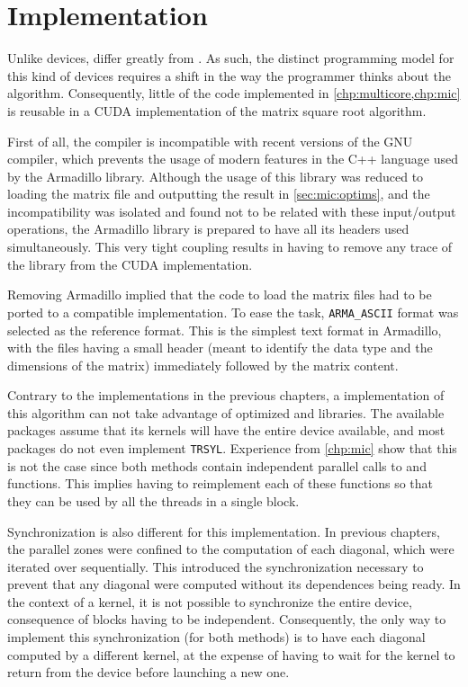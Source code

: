\documentclass[../thesis]{subfiles}
\begin{document}
	\section{Implementation}
	\label{sec:cuda:implementation}
	
	Unlike \mic devices, \gpus differ greatly from \cpus. As such, the distinct programming model for this kind of devices requires a shift in the way the programmer thinks about the algorithm. Consequently, little of the code implemented in \cref{chp:multicore,chp:mic} is reusable in a CUDA implementation of the matrix square root algorithm.

	First of all, the \nvidia compiler is incompatible with recent versions of the GNU compiler, which prevents the usage of modern features in the C++ language used by the Armadillo library. Although the usage of this library was reduced to loading the matrix file and outputting the result in \cref{sec:mic:optims}, and the incompatibility was isolated and found not to be related with these input/output operations, the Armadillo library is prepared to have all its headers used simultaneously. This very tight coupling results in having to remove any trace of the library from the CUDA implementation.

	Removing Armadillo implied that the code to load the matrix files had to be ported to a compatible implementation. To ease the task, \texttt{ARMA\_ASCII} format was selected as the reference format. This is the simplest text format in Armadillo, with the files having a small header (meant to identify the data type and the dimensions of the matrix) immediately followed by the matrix content.

	Contrary to the implementations in the previous chapters, a \cuda implementation of this algorithm can not take advantage of optimized \blas and \lapack libraries. The available packages assume that its kernels will have the entire device available, and most \lapack packages do not even implement \texttt{TRSYL}. Experience from \cref{chp:mic} show that this is not the case since both methods contain independent parallel calls to \blas and \lapack functions. This implies having to reimplement each of these functions so that they can be used by all the threads in a single \cuda block.

	Synchronization is also different for this implementation. In previous chapters, the parallel zones were confined to the computation of each diagonal, which were iterated over sequentially. This introduced the synchronization necessary to prevent that any diagonal were computed without its dependences being ready. In the context of a \cuda kernel, it is not possible to synchronize the entire device, consequence of blocks having to be independent. Consequently, the only way to implement this synchronization (for both methods) is to have each diagonal computed by a different kernel, at the expense of having to wait for the kernel to return from the device before launching a new one.
\end{document}
